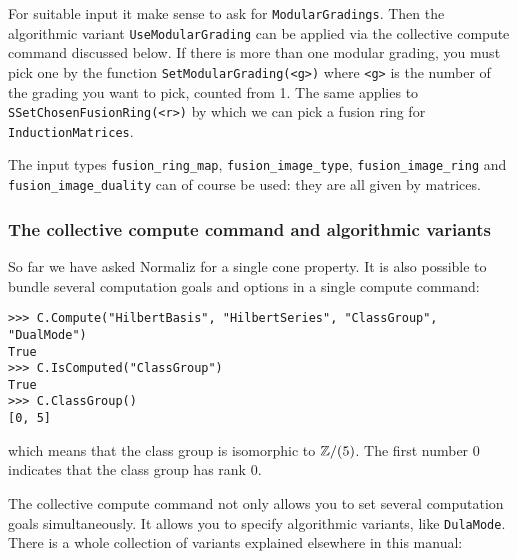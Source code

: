 \begin{small}
For suitable input it make sense to ask for \verb*|ModularGradings|. Then the algorithmic variant \verb*|UseModularGrading| can be applied via the collective compute command discussed below. If there is more than one modular grading, you must pick one by the function \verb*|SetModularGrading(<g>)| where  \verb*|<g>| is the number of the grading you want to pick, counted from 1. The same applies to \verb*|SSetChosenFusionRing(<r>)| by which we can pick a fusion ring for \verb*|InductionMatrices|.

The input types \verb*|fusion_ring_map|, \verb*|fusion_image_type|, \verb*|fusion_image_ring| and \verb*|fusion_image_duality| can of course be used: they are all given by matrices.

\subsubsection{The collective compute command and algorithmic variants}\label{CollComp}
So far we have asked Normaliz for a single cone property. It is also possible to bundle several computation goals and options in a single compute command:
\begin{Verbatim}
>>> C.Compute("HilbertBasis", "HilbertSeries", "ClassGroup", "DualMode")
True
>>> C.IsComputed("ClassGroup")
True
>>> C.ClassGroup()
[0, 5]
\end{Verbatim}
which means that the class group is isomorphic to ${\mathbb Z}/(5)$. The first number $0$ indicates that the class group has rank $0$.

The collective compute command not only allows you to set several computation goals simultaneously. It allows you to specify algorithmic variants, like \verb|DulaMode|. There is a whole collection of variants explained elsewhere in this manual:



\end{small}
